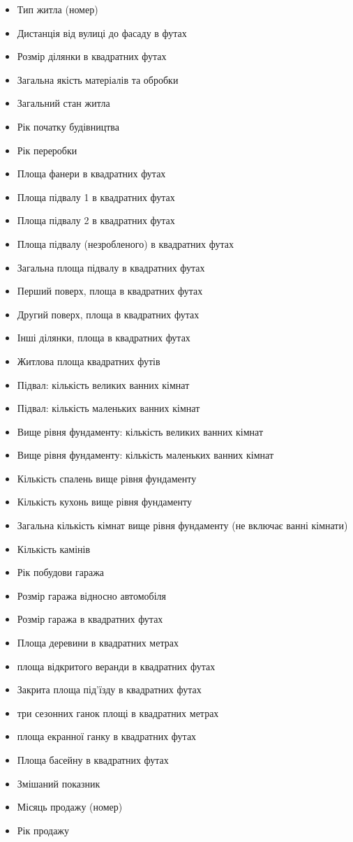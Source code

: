 \documentclass[11pt]{article}
\providecommand{\tightlist}{%
      \setlength{\itemsep}{0pt}\setlength{\parskip}{0pt}}
\begin{document}
\begin{itemize}
\tightlist
\item
  Тип житла (номер)
\item
  Дистанція від вулиці до фасаду в футах
\item
  Розмір ділянки в квадратних футах
\item
  Загальна якість матеріалів та обробки
\item
  Загальний стан житла
\item
  Рік початку будівництва
\item
  Рік переробки
\item
  Площа фанери в квадратних футах
\item
  Площа підвалу 1 в квадратних футах
\item
  Площа підвалу 2 в квадратних футах
\item
  Площа підвалу (незробленого) в квадратних футах
\item
  Загальна площа підвалу в квадратних футах
\item
  Перший поверх, площа в квадратних футах
\item
  Другий поверх, площа в квадратних футах
\item
  Інші ділянки, площа в квадратних футах
\item
  Житлова площа квадратних футів
\item
  Підвал: кількість великих ванних кімнат
\item
  Підвал: кількість маленьких ванних кімнат
\item
  Вище рівня фундаменту: кількість великих ванних кімнат
\item
  Вище рівня фундаменту: кількість маленьких ванних кімнат
\item
  Кількість спалень вище рівня фундаменту
\item
  Кількість кухонь вище рівня фундаменту
\item
  Загальна кількість кімнат вище рівня фундаменту (не включає ванні
  кімнати)
\item
  Кількість камінів
\item
  Рік побудови гаража
\item
  Розмір гаража відносно автомобіля
\item
  Розмір гаража в квадратних футах
\item
  Площа деревини в квадратних метрах
\item
  площа відкритого веранди в квадратних футах
\item
  Закрита площа під'їзду в квадратних футах
\item
  три сезонних ганок площі в квадратних метрах
\item
  площа екранної ганку в квадратних футах
\item
  Площа басейну в квадратних футах
\item
  Змішаний показник
\item
  Місяць продажу (номер)
\item
  Рік продажу
\end{itemize}
\end{document}
